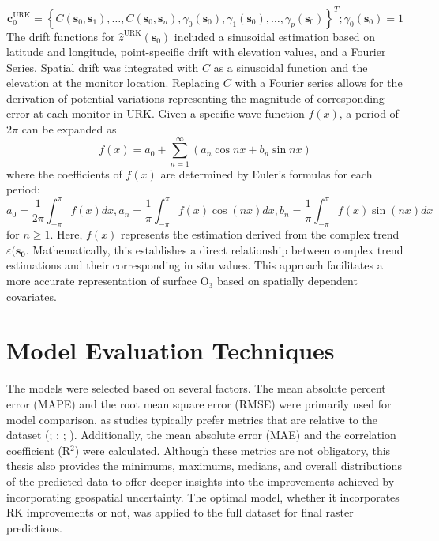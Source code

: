 \[
\mathbf{c}_0^{\mathrm{URK}} =
\left\{ C(\mathbf{s}_0, \mathbf{s}_1), \ldots, C(\mathbf{s}_0, \mathbf{s}_n), \gamma_0(\mathbf{s}_0), \gamma_1(\mathbf{s}_0), \ldots, \gamma_p(\mathbf{s}_0) \right\}^{T} ; \gamma_0(\mathbf{s}_0) = 1
\]
The drift functions for $\hat{z}^{\mathrm{URK}}(\mathbf{s}_0)$ included a sinusoidal estimation based on latitude and longitude, point-specific drift with elevation values, and a Fourier Series. Spatial drift was integrated with $C$ as a sinusoidal function and the elevation at the monitor location. Replacing $C$ with a Fourier series allows for the derivation of potential variations representing the magnitude of corresponding error at each monitor in URK. Given a specific wave function $f(x)$, a period of $2\pi$ can be expanded as 
\[f(x) = a_0 + \sum_{n=1}^\infty (a_n\cos nx +b_n\sin nx)\] 
where the coefficients of $f(x)$ are determined by Euler's formulas for each period: 
\[a_0 = \frac{1}{2\pi}\int_{-\pi}^\pi f(x)dx, a_n =  \frac{1}{\pi}\int_{-\pi}^\pi f(x)\cos (nx) dx,b_n =  \frac{1}{\pi}\int_{-\pi}^\pi f(x)\sin (nx) dx\]
for $n\geq 1$. Here, $f(x)$ represents the estimation derived from the complex trend $\varepsilon(\mathbf{s}_\mathbf{0}$. Mathematically, this establishes a direct relationship between complex trend estimations and their corresponding in situ values. This approach facilitates a more accurate representation of surface O$_3$ based on spatially dependent covariates. 
\section{Model Evaluation Techniques} \label{methods:erroreval} The models were selected based on several factors. The mean absolute percent error (MAPE) and the root mean square error (RMSE) were primarily used for model comparison, as studies typically prefer metrics that are relative to the dataset (\cite{hu_optimized_2023}; \cite{mu_estimation_2023}; \cite{pan_comparison_2023}; \cite{zhang_deep_2023}). Additionally, the mean absolute error (MAE) and the correlation coefficient (R$^2$) were calculated. Although these metrics are not obligatory, this thesis also provides the minimums, maximums, medians, and overall distributions of the predicted data to offer deeper insights into the improvements achieved by incorporating geospatial uncertainty. The optimal model, whether it incorporates RK improvements or not, was applied to the full dataset for final raster predictions. 

